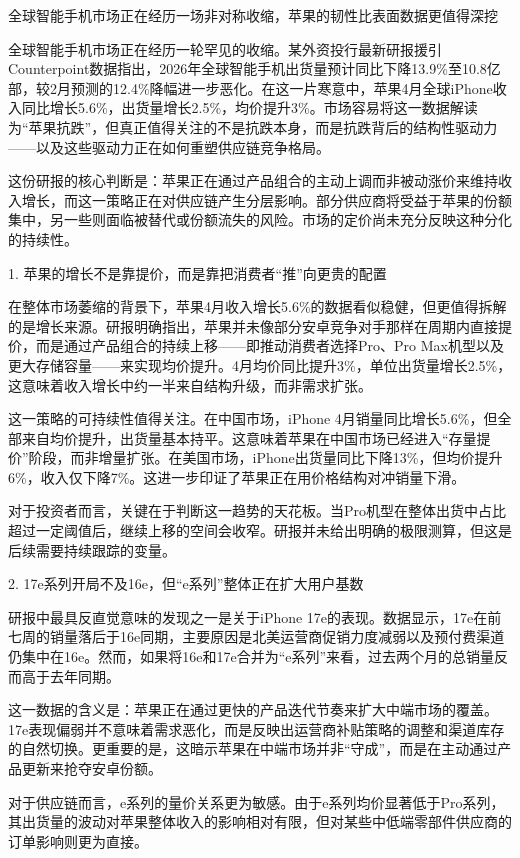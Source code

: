 \documentclass[11pt]{ctexart}
\begin{document}
全球智能手机市场正在经历一场非对称收缩，苹果的韧性比表面数据更值得深挖

全球智能手机市场正在经历一轮罕见的收缩。某外资投行最新研报援引Counterpoint数据指出，2026年全球智能手机出货量预计同比下降13.9\%至10.8亿部，较2月预测的12.4\%降幅进一步恶化。在这一片寒意中，苹果4月全球iPhone收入同比增长5.6\%，出货量增长2.5\%，均价提升3\%。市场容易将这一数据解读为“苹果抗跌”，但真正值得关注的不是抗跌本身，而是抗跌背后的结构性驱动力——以及这些驱动力正在如何重塑供应链竞争格局。

这份研报的核心判断是：苹果正在通过产品组合的主动上调而非被动涨价来维持收入增长，而这一策略正在对供应链产生分层影响。部分供应商将受益于苹果的份额集中，另一些则面临被替代或份额流失的风险。市场的定价尚未充分反映这种分化的持续性。

1. 苹果的增长不是靠提价，而是靠把消费者“推”向更贵的配置

在整体市场萎缩的背景下，苹果4月收入增长5.6\%的数据看似稳健，但更值得拆解的是增长来源。研报明确指出，苹果并未像部分安卓竞争对手那样在周期内直接提价，而是通过产品组合的持续上移——即推动消费者选择Pro、Pro Max机型以及更大存储容量——来实现均价提升。4月均价同比提升3\%，单位出货量增长2.5\%，这意味着收入增长中约一半来自结构升级，而非需求扩张。

这一策略的可持续性值得关注。在中国市场，iPhone 4月销量同比增长5.6\%，但全部来自均价提升，出货量基本持平。这意味着苹果在中国市场已经进入“存量提价”阶段，而非增量扩张。在美国市场，iPhone出货量同比下降13\%，但均价提升6\%，收入仅下降7\%。这进一步印证了苹果正在用价格结构对冲销量下滑。

对于投资者而言，关键在于判断这一趋势的天花板。当Pro机型在整体出货中占比超过一定阈值后，继续上移的空间会收窄。研报并未给出明确的极限测算，但这是后续需要持续跟踪的变量。

2. 17e系列开局不及16e，但“e系列”整体正在扩大用户基数

研报中最具反直觉意味的发现之一是关于iPhone 17e的表现。数据显示，17e在前七周的销量落后于16e同期，主要原因是北美运营商促销力度减弱以及预付费渠道仍集中在16e。然而，如果将16e和17e合并为“e系列”来看，过去两个月的总销量反而高于去年同期。

这一数据的含义是：苹果正在通过更快的产品迭代节奏来扩大中端市场的覆盖。17e表现偏弱并不意味着需求恶化，而是反映出运营商补贴策略的调整和渠道库存的自然切换。更重要的是，这暗示苹果在中端市场并非“守成”，而是在主动通过产品更新来抢夺安卓份额。

对于供应链而言，e系列的量价关系更为敏感。由于e系列均价显著低于Pro系列，其出货量的波动对苹果整体收入的影响相对有限，但对某些中低端零部件供应商的订单影响则更为直接。
\end{document}
